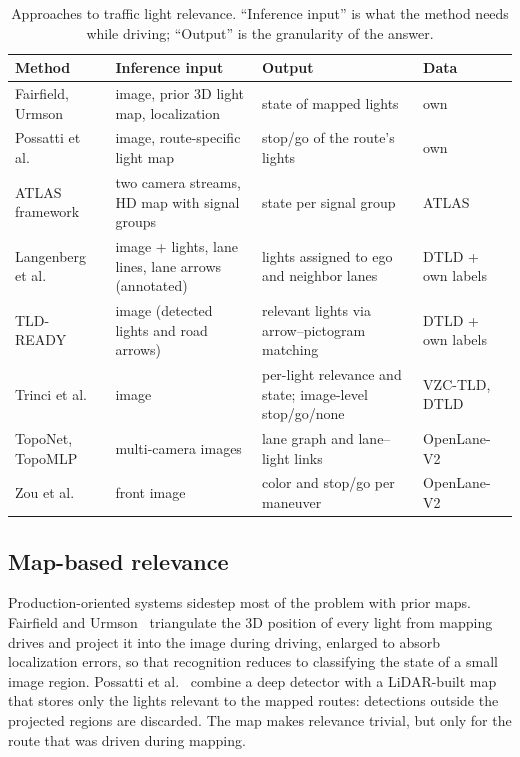 \begin{table}[t]
\centering
\caption{Approaches to traffic light relevance. ``Inference input'' is what the method needs while
driving; ``Output'' is the granularity of the answer.}
\label{tab:relevance-methods}
\footnotesize
\begin{tabularx}{\textwidth}{@{}>{\raggedright\arraybackslash}p{3.0cm}>{\raggedright\arraybackslash}X>{\raggedright\arraybackslash}X>{\raggedright\arraybackslash}p{2.4cm}@{}}
\toprule
Method & Inference input & Output & Data \\
\midrule
Fairfield, Urmson~\cite{fairfield2011traffic} & image, prior 3D light map, localization & state of mapped lights & own \\
Possatti et al.~\cite{possatti2019traffic} & image, route-specific light map & stop/go of the route's lights & own \\
ATLAS framework~\cite{polley2025atlas} & two camera streams, HD map with signal groups & state per signal group & ATLAS \\
Langenberg et al.~\cite{langenberg2019deep} & image + lights, lane lines, lane arrows (annotated) & lights assigned to ego and neighbor lanes & DTLD + own labels \\
TLD-READY~\cite{polley2024tldready} & image (detected lights and road arrows) & relevant lights via arrow--pictogram matching & DTLD + own labels \\
Trinci et al.~\cite{trinci2026color} & image & per-light relevance and state; image-level stop/go/none & VZC-TLD, DTLD \\
TopoNet, TopoMLP~\cite{li2023graph,wu2024topomlp} & multi-camera images & lane graph and lane--light links & OpenLane-V2 \\
Zou et al.~\cite{zou2026oneperception} & front image & color and stop/go per maneuver & OpenLane-V2 \\
\bottomrule
\end{tabularx}
\end{table}

\subsection{Map-based relevance}
\label{sec:bg-maps}

Production-oriented systems sidestep most of the problem with prior maps. Fairfield and
Urmson~\cite{fairfield2011traffic} triangulate the 3D position of every light from mapping drives and
project it into the image during driving, enlarged to absorb localization errors, so that recognition
reduces to classifying the state of a small image region. Possatti et al.~\cite{possatti2019traffic}
combine a deep detector with a LiDAR-built map that stores only the lights relevant to the mapped
routes: detections outside the projected regions are discarded. The map makes relevance trivial, but
only for the route that was driven during mapping.

